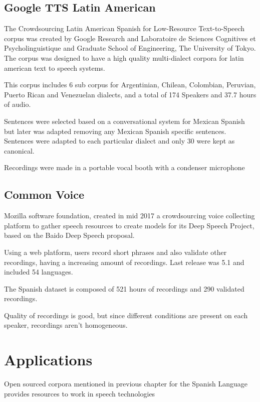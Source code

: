 \documentclass[10pt, a4paper]{article}
\begin{document}
\subsection{Google TTS Latin American}

The Crowdsourcing Latin American Spanish for Low-Resource Text-to-Speech corpus was created by Google Research and Laboratoire de Sciences Cognitives et Psycholinguistique and Graduate School of Engineering, The University of Tokyo. The corpus was designed to have a high quality multi-dialect corpora for latin american text to speech systems.

This corpus includes 6 sub corpus for Argentinian, Chilean, Colombian, Peruvian, Puerto Rican and Venezuelan dialects, and a total of 174 Speakers and 37.7 hours of audio.

Sentences were selected based on a conversational system for Mexican Spanish but later was adapted removing any Mexican Spanish specific sentences. Sentences were adapted to each particular dialect and only 30 were kept as canonical.

Recordings were made in a portable vocal booth with a condenser microphone \cite{googleTTSLatinAmericanSpanishCorpus}



\subsection{Common Voice}

Mozilla software foundation, created in mid 2017 a crowdsourcing voice collecting platform to gather speech resources to create models for its Deep Speech Project, based on the Baido Deep Speech \cite{deepspeeh} proposal.

Using a web platform, users record short phrases and also validate other recordings, having a increasing amount of recordings. Last release was 5.1 and included  54 languages.

The Spanish dataset is composed of 521 hours of recordings and 290 validated recordings.

Quality of recordings is good, but since different conditions are present on each speaker, recordings aren't homogeneous.



\section{Applications}

Open sourced corpora mentioned in previous chapter for the Spanish Language provides resources to work in speech technologies
\end{document}
